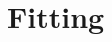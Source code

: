 \documentclass[../thesis.tex]{subfiles}
\begin{document}
\chapter{Fitting}
\label{chap:fitting}
\end{document}
